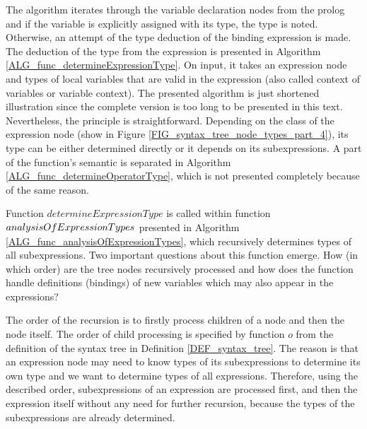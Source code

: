 The algorithm iterates through the variable declaration nodes from the prolog and if the variable is explicitly assigned with its type, the type is noted. Otherwise, an attempt of the type deduction of the binding expression is made. The deduction of the type from the expression is presented in Algorithm \ref{ALG_func_determineExpressionType}. On input, it takes an expression node and types of local variables that are valid in the expression (also called context of variables or variable context). The presented algorithm is just shortened illustration since the complete version is too long to be presented in this text. Nevertheless, the principle is straightforward. Depending on the class of the expression node (show in Figure \ref{FIG_syntax_tree_node_types_part_4}), its type can be either determined directly or it depends on its subexpressions. A part of the function's semantic is separated in Algorithm \ref{ALG_func_determineOperatorType}, which is not presented completely because of the same reason.

Function $determineExpressionType$ is called within function $analysis\-Of\-Expression\-Types$ presented in Algorithm \ref{ALG_func_analysisOfExpressionTypes}, which recursively determines types of all subexpressions. Two important questions about this function emerge. How (in which order) are the tree nodes recursively processed and how does the function handle definitions (bindings) of new variables which may also appear in the expressions?

The order of the recursion is to firstly process children of a node and then the node itself. The order of child processing is specified by function $o$ from the definition of the syntax tree in Definition \ref{DEF_syntax_tree}. The reason is that an expression node may need to know types of its subexpressions to determine its own type and we want to determine types of all expressions. Therefore, using the described order, subexpressions of an expression are processed first, and then the expression itself without any need for further recursion, because the types of the subexpressions are already determined.

